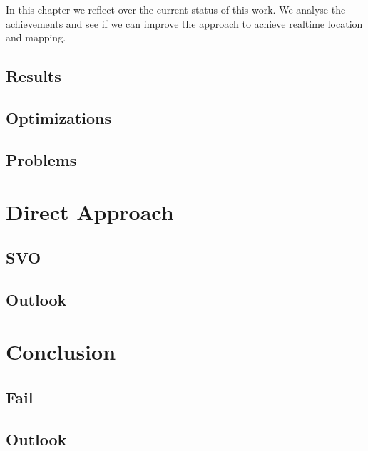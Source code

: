 \documentclass[11pt,a4paper,titlepage,oneside]{report}
\begin{document}
In this chapter we reflect over the current status of this work. We analyse the achievements and see if we can improve the approach to achieve realtime location and mapping.

\section{Results}

\section{Optimizations}

\section{Problems}

\chapter{Direct Approach}

\section{SVO}

\section{Outlook}

\chapter{Conclusion}

\section{Fail}

\section{Outlook}

\listoffigures
 
\end{document}
